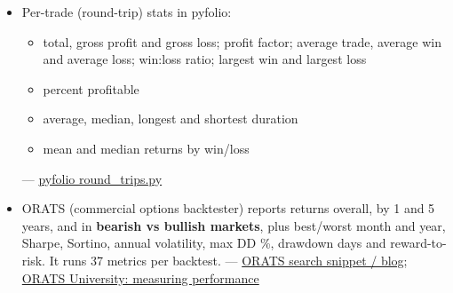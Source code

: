\documentclass{article}
\begin{document}
\begin{itemize}
\begin{itemize}
\item \texttt{tail\_\allowbreak{}ratio} uses a 95th/\allowbreak{}5th percentile cutoff

\item Calmar = CAGR /\allowbreak{} |max DD|

\item also: \texttt{ulcer\_\allowbreak{}index}, \texttt{to\_\allowbreak{}drawdown\_\allowbreak{}series}, \texttt{probabilistic\_\allowbreak{}sharpe\_\allowbreak{}ratio}, \texttt{gain\_\allowbreak{}to\_\allowbreak{}pain\_\allowbreak{}ratio}, \texttt{kelly\_\allowbreak{}criterion}

\end{itemize}

--- \href{https://raw.githubusercontent.com/ranaroussi/quantstats/main/quantstats/stats.py}{quantstats/\allowbreak{}stats.py}

\item Per-trade (round-trip) stats in pyfolio:

\begin{itemize}

\item total, gross profit and gross loss; profit factor; average trade, average win and average loss; win:loss ratio; largest win and largest loss

\item percent profitable

\item average, median, longest and shortest duration

\item mean and median returns by win/\allowbreak{}loss

\end{itemize}

--- \href{https://raw.githubusercontent.com/quantopian/pyfolio/master/pyfolio/round_trips.py}{pyfolio round\_trips.py}

\item ORATS (commercial options backtester) reports returns overall, by 1 and 5 years, and in \textbf{bearish vs bullish markets}, plus best/\allowbreak{}worst month and year, Sharpe, Sortino, annual volatility, max DD \%, drawdown days and reward-to-risk. It runs 37 metrics per backtest. --- \href{https://orats.com/blog/behind-the-scenes-of-over-50-million-options-backtests}{ORATS search snippet /\allowbreak{} blog}; \href{https://orats.com/university/measuring-performance}{ORATS University: measuring performance}

\end{itemize}
\end{document}
